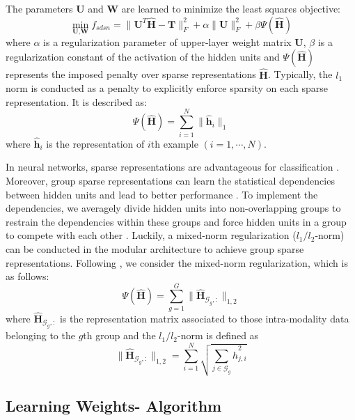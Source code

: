 \documentclass[letterpaper]{article}
\begin{document}
The parameters $\textbf{U}$ and $\textbf{W}$ are learned to minimize the least squares objective:
\begin{equation}
\min_{\textbf{U},\textbf{W}}f_{sdsn} = \|\textbf{U}^T\widehat{\textbf{H}}-\textbf{T}\|^2_F+\alpha\|\textbf{U}\|^2_F + \beta \Psi(\widehat{\textbf{H}})
\label{eq:sdsn}
\end{equation}
where $\alpha$ is a regularization parameter of upper-layer weight matrix $\textbf{U}$, $\beta$ is a regularization constant of the activation of the hidden units and $\Psi(\widehat{\textbf{H}})$ represents the imposed penalty over sparse representations $\widehat{\textbf{H}}$. Typically, the $l_1$ norm is conducted as a penalty to explicitly enforce sparsity on each sparse representation. It is described as:
\begin{equation}
\Psi(\widehat{\textbf{H}})=\sum_{i=1}^N \|\widehat{\textbf{h}}_{i}\|_1
\label{eq:sparsel1}
\end{equation}
where $\widehat{\textbf{h}}_{i}$ is the representation of $i$th example $(i=1,\cdots,N)$.

In neural networks, sparse representations are advantageous for classification \cite{Ranzato2007}. Moreover, group sparse representations \cite{SBengio2009} can learn the statistical dependencies between hidden units and lead to better performance \cite{Luo2011}. To implement the dependencies, we averagely divide hidden units into non-overlapping groups to restrain the dependencies within these groups and force hidden units in a group to compete with each other \cite{Luo2011}. Luckily, a mixed-norm regularization ($l_1/l_2$-norm) can be conducted in the modular architecture to achieve group sparse representations. Following \cite{Luo2011}, we consider the mixed-norm regularization, which is as follows:
\begin{equation}
\Psi(\widehat{\textbf{H}})= \sum_{g=1}^G\|\widehat{\textbf{H}}_{\mathcal{G}_g,:}\|_{1,2}
\label{eq:sparsel1l2}
\end{equation}
where $\widehat{\textbf{H}}_{\mathcal{G}_g,:}$ is the representation matrix associated to those intra-modality data belonging to the $g$th group and the $l_1/l_2$-norm is defined as
\begin{equation}
\|\widehat{\textbf{H}}_{\mathcal{G}_g,:}\|_{1,2}=\sum_{i=1}^N\sqrt{\sum_{j\in\mathcal{G}_g}\widehat{h}_{j,i}^2}
\end{equation}

\subsection{Learning Weights- Algorithm}
\end{document}
